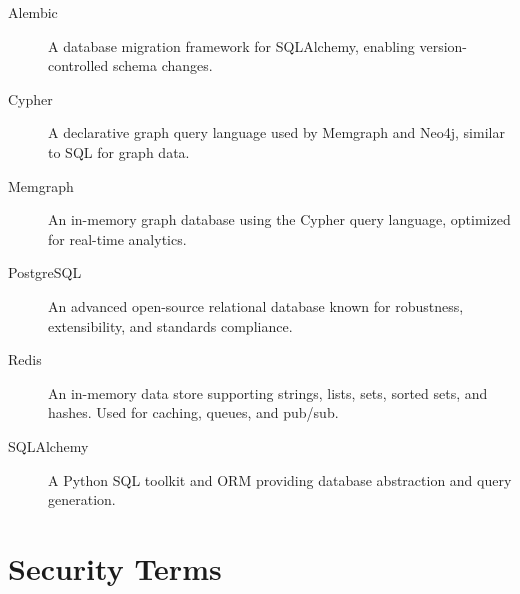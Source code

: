 \documentclass[a4paper,twoside]{sapthesis}
\begin{document}
\begin{description}

\item[Alembic]
A database migration framework for SQLAlchemy, enabling version-controlled schema changes.

\item[Cypher]
A declarative graph query language used by Memgraph and Neo4j, similar to SQL for graph data.

\item[Memgraph]
An in-memory graph database using the Cypher query language, optimized for real-time analytics.

\item[PostgreSQL]
An advanced open-source relational database known for robustness, extensibility, and standards compliance.

\item[Redis]
An in-memory data store supporting strings, lists, sets, sorted sets, and hashes. Used for caching, queues, and pub/sub.

\item[SQLAlchemy]
A Python SQL toolkit and ORM providing database abstraction and query generation.

\end{description}

\section{Security Terms}
\label{app:glossary:security}
\end{document}
